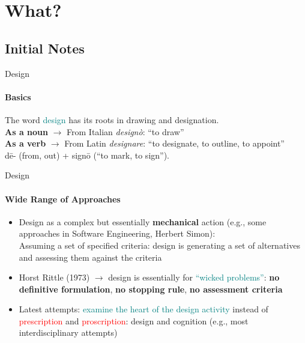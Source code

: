 \documentclass[
	11pt,
	aspectratio=169,
]{beamer}
\begin{document}
    \section{What?}
        \subsection{Initial Notes}
            \begin{frame}{Design}
                \framesubtitle{Basics}
                The word \textcolor{teal}{design} has its roots in drawing and designation. \\
        	    \textbf{As a noun} $\longrightarrow$ From Italian \textit{\rm designò}: ``to draw''\\
        	    \textbf{As a verb} $\longrightarrow$ From Latin \textit{\rm designare}: ``to designate, to outline, to appoint''\\
        	    \centering dē- (from, out) + signō (``to mark, to sign''). 
            \end{frame}
            \begin{frame}{Design}
                \framesubtitle{Wide Range of Approaches}
        		\begin{itemize}
        			\item<1->Design as a complex but essentially \textbf{mechanical} action (e.g., some approaches in Software Engineering, Herbert Simon):\\
        			    Assuming a set of specified criteria: design is generating a set of  alternatives and assessing them against the criteria
        			\item<2-> Horst Rittle (1973) $\longrightarrow$ design is essentially for \textcolor{teal}{``wicked problems''}:
        			\textbf{no definitive formulation}, \textbf{no stopping rule}, \textbf{no assessment criteria}
        			\item<3->Latest attempts: \textcolor{teal}{examine the heart of the design activity} instead of \textcolor{red}{prescription} and \textcolor{red}{proscription}: design and cognition (e.g., most interdisciplinary attempts)
        		\end{itemize}
            \end{frame}
\end{document}
